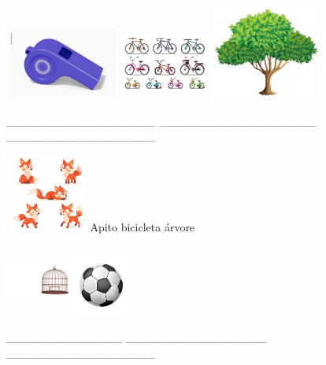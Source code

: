 {{\includegraphics[width=1.46154in,height=0.93603in]{media/image49.jpeg}
\includegraphics[width=1.16587in,height=0.93269in]{media/image50.jpeg}
\includegraphics[width=1.42308in,height=1.21950in]{media/image51.jpeg}

\_\_\_\_\_\_\_\_\_\_\_\_\_\_\_\_\_\_
\_\_\_\_\_\_\_\_\_\_\_\_\_\_\_\_\_\_\_
\_\_\_\_\_\_\_\_\_\_\_\_\_\_\_\_\_\_

\includegraphics[width=1.10833in,height=1.00903in]{media/image52.jpeg}Apito
bicicleta árvore

\includegraphics[width=0.85556in,height=0.92222in]{media/image53.jpeg}\includegraphics[width=0.79808in,height=0.79808in]{media/image54.jpeg}

\_\_\_\_\_\_\_\_\_\_\_\_\_\_ \_\_\_\_\_\_\_\_\_\_\_\_\_\_\_\_\_
\_\_\_\_\_\_\_\_\_\_\_\_\_\_\_\_\_\_

}}
